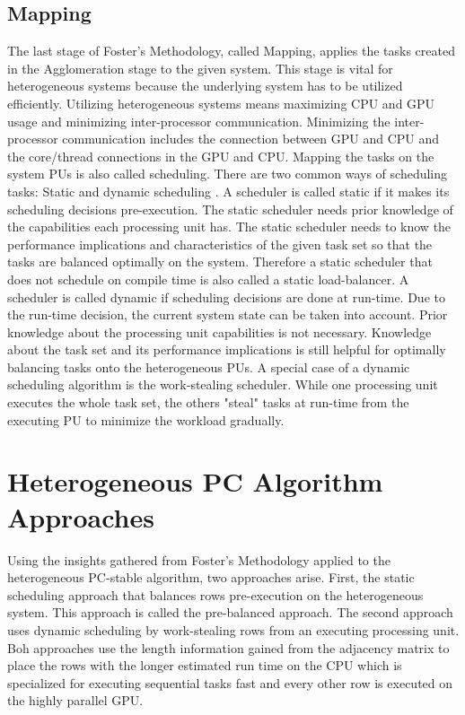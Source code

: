 \subsection{Mapping}
The last stage of Foster's Methodology, called Mapping, applies the tasks created in the Agglomeration stage to the given system. This stage is vital for heterogeneous systems because the underlying system has to be utilized efficiently. Utilizing heterogeneous systems means maximizing CPU and GPU usage and minimizing inter-processor communication. Minimizing the inter-processor communication includes the connection between GPU and CPU and the core/thread connections in the GPU and CPU.
Mapping the tasks on the system PUs is also called scheduling. There are two common ways of scheduling tasks: Static and dynamic scheduling \cite{kopetzRealTimeScheduling1997}.
A scheduler is called static if it makes its scheduling decisions pre-execution. The static scheduler needs prior knowledge of the capabilities each processing unit has. The static scheduler needs to know the performance implications and characteristics of the given task set so that the tasks are balanced optimally on the system. Therefore a static scheduler that does not schedule on compile time is also called a static load-balancer.
A scheduler is called dynamic if scheduling decisions are done at run-time. Due to the run-time decision, the current system state can be taken into account. Prior knowledge about the processing unit capabilities is not necessary. Knowledge about the task set and its performance implications is still helpful for optimally balancing tasks onto the heterogeneous PUs.
A special case of a dynamic scheduling algorithm is the work-stealing scheduler. While one processing unit executes the whole task set, the others "steal" tasks at run-time from the executing PU to minimize the workload gradually.

\section{Heterogeneous PC Algorithm Approaches}
Using the insights gathered from Foster's Methodology applied to the heterogeneous PC-stable algorithm, two approaches arise. First, the static scheduling approach that balances rows pre-execution on the heterogeneous system. This approach is called the pre-balanced approach. The second approach uses dynamic scheduling by work-stealing rows from an executing processing unit. Boh approaches use the length information gained from the adjacency matrix to place the rows with the longer estimated run time on the CPU which is specialized for executing sequential tasks fast and every other row is executed on the highly parallel GPU.

